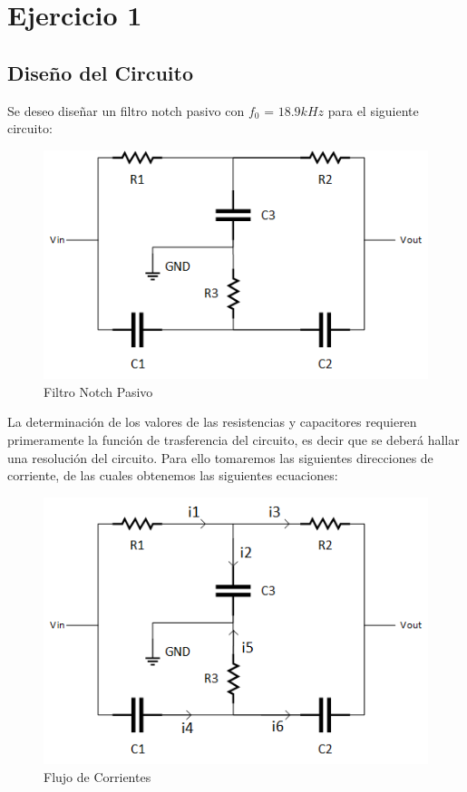 \section{Ejercicio 1}

\subsection{Diseño del Circuito}

Se deseo diseñar un filtro notch pasivo con $f_0$ = $18.9 kHz$ para el siguiente circuito: 

\begin{figure}[h]
	\centering
	\includegraphics[scale=1]{../EJ1/circuito.png}
	\caption{Filtro Notch Pasivo}
	\label{ej1cir}
\end{figure}

La determinación de los valores de las resistencias y capacitores requieren primeramente la función de trasferencia del circuito, es decir que se deberá hallar una resolución del circuito. Para ello tomaremos las siguientes direcciones de corriente, de las cuales obtenemos las siguientes ecuaciones:

\begin{figure}
\centering
\includegraphics[scale=0.6]{../EJ1/circuitois.png}
\caption{Flujo de Corrientes}
\label{fig_2}
\end{figure}


